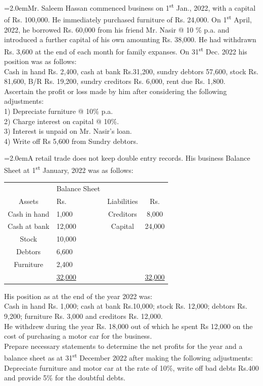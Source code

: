 \documentclass[11pt,a4paper]{article}
\newcommand{\lqn}[2]{\Needspace{6\baselineskip}\par\medskip\noindent\hangindent=2.0em\hangafter=1\makebox[2.0em][l]{\textbf{#1.}}#2\par}
\begin{document}
\lqn{7}{Mr. Saleem Hassan commenced business on 1\textsuperscript{st}  Jan., 2022, with a capital of Rs. 100,000. He immediately purchased furniture of Rs. 24,000. On 1\textsuperscript{st}  April, 2022, he borrowed Rs. 60,000 from his friend Mr. Nasir @ 10 \% p.a. and introduced a further capital of his own amounting Rs. 38,000. He had withdrawn Rs. 3,600 at the end of each month for family expanses. On 31\textsuperscript{st}  Dec. 2022 his position was as follows:\\
Cash in hand Rs. 2,400, cash at bank Rs.31,200, sundry debtors 57,600, stock Rs. 81,600, B/R Rs. 19,200, sundry creditors Rs. 6,000, rent due Rs. 1,800.\\
Ascertain the profit or loss made by him after considering the following adjustments:\\
1) Depreciate furniture @ 10\% p.a.\\
2) Charge interest on capital @ 10\%.\\
3) Interest is unpaid on Mr. Nasir’s loan.\\
4) Write off Rs 5,600 from Sundry debtors.\par
}
\lqn{8}{A retail trade does not keep double entry records. His business Balance Sheet at 1\textsuperscript{st}  January, 2022 was as follows:\par
\par\smallskip\noindent\hspace*{1.2em}\begin{tabular}{|clcc|}
\hline
 & Balance Sheet &  &  \\
Assets & Rs. & Liabilities & Rs. \\
Cash in hand & 1,000 & Creditors & 8,000 \\
Cash at bank & 12,000 & Capital & 24,000 \\
Stock & 10,000 &  &  \\
Debtors & 6,600 &  &  \\
Furniture & 2,400 &  &  \\
 & \underline{32,000} &  & \underline{32,000} \\
\hline
\end{tabular}\par\smallskip
His position as at the end of the year 2022 was:\\
Cash in hand Rs. 1,000; cash at bank Rs.10,000; stock Rs. 12,000; debtors Rs. 9,200; furniture Rs. 3,000 and creditors Rs. 12,000.\\
He withdrew during the year Rs. 18,000 out of which he spent Rs 12,000 on the cost of purchasing a motor car for the business.\\
Prepare necessary statements to determine the net profits for the year and a balance sheet as at 31\textsuperscript{st}  December 2022 after making the following adjustments:\\
Depreciate furniture and motor car at the rate of 10\%, write off bad debts Rs.400 and provide 5\% for the doubtful debts.\par
}
\end{document}
